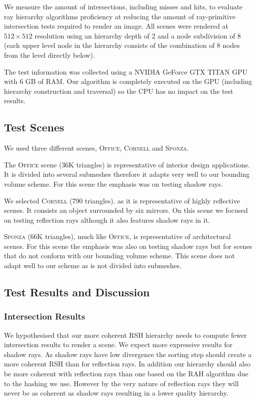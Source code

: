 \documentclass{egpubl}
\begin{document}
We measure the amount of intersections, including misses and hits, to evaluate ray hierarchy algorithms proficiency at reducing the amount of ray-primitive intersection tests required to render an image. All scenes were rendered at $512\times512$ resolution using an hierarchy depth of 2 and a node subdivision of 8 (each upper level node in the hierarchy consists of the combination of 8 nodes from the level directly below).

The test information was collected using a NVIDIA GeForce GTX TITAN GPU with 6 GB of RAM. Our algorithm is completely executed on the GPU (including hierarchy construction and traversal) so the CPU has no impact on the test results.

\subsection{Test Scenes}

We used three different scenes, \textsc{Office}, \textsc{Cornell} and \textsc{Sponza}.

The \textsc{Office} scene (36K triangles) is representative of interior design applications. It is divided into several submeshes therefore it adapts very well to our bounding volume scheme. For this scene the emphasis was on testing shadow rays. 

We selected \textsc{Cornell} (790 triangles). as it is representative of highly reflective scenes. It consists an object surrounded by six mirrors. On this scene we focused on testing reflection rays although it also features shadow rays in it.

\textsc{Sponza} (66K triangles), much like \textsc{Office}, is representative of architectural scenes. For this scene the emphasis was also on testing shadow rays but for scenes that do not conform with our bounding volume scheme. This scene does not adapt well to our scheme as is not divided into submeshes. 

\subsection{Test Results and Discussion}

\subsubsection{Intersection Results}

We hypothesised that our more coherent RSH hierarchy needs to compute fewer intersection results to render a scene. We expect more expressive results for shadow rays. As shadow rays have low divergence the sorting step should create a more coherent RSH than for reflection rays. In addition our hierarchy should also be more coherent with reflection rays than one based on the RAH algorithm due to the hashing we use. However by the very nature of reflection rays they will never be as coherent as shadow rays resulting in a lower quality hierarchy.
\end{document}
